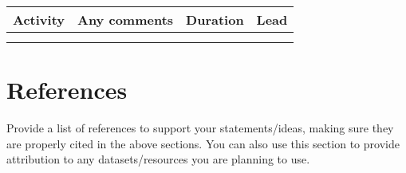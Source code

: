 \documentclass[11pt]{article}
\begin{document}
\begin{table}[h]
\centering
\begin{tabular}{|l|l|c|c|}
\hline
\textbf{Activity} & \textbf{Any comments} & \textbf{Duration} & \textbf{Lead}\\
\hline
& & & \\
\hline
& & & \\
\hline
\end{tabular}
\end{table}


\section*{References}
Provide a list of references to support your statements/ideas, making sure they are properly cited in the above sections. You can also use this section to provide attribution to any datasets/resources you are planning to use.
\end{document}
